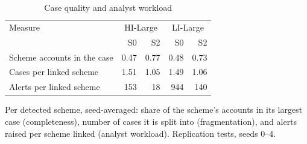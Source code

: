 \begin{table}[!t]
\centering
\caption{Case quality and analyst workload}
\label{tab:casequality}
\footnotesize
\setlength{\tabcolsep}{4pt}
\begin{tabular}{lrrrr}
\hline
Measure & \multicolumn{2}{c}{HI-Large} & \multicolumn{2}{c}{LI-Large} \\
 & S0 & S2 & S0 & S2 \\
\hline
Scheme accounts in the case & 0.47 & 0.77 & 0.48 & 0.73 \\
Cases per linked scheme & 1.51 & 1.05 & 1.49 & 1.06 \\
Alerts per linked scheme & 153 & 18 & 944 & 140 \\
\hline
\end{tabular}
\par\smallskip\parbox{\linewidth}{\scriptsize Per detected scheme, seed-averaged: share of the scheme's accounts in its largest case (completeness), number of cases it is split into (fragmentation), and alerts raised per scheme linked (analyst workload). Replication tests, seeds 0--4.}
\end{table}
